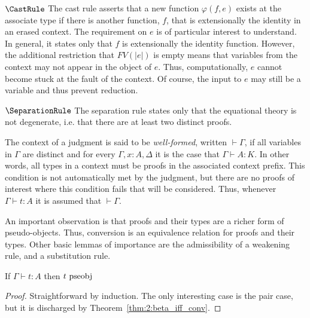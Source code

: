 $\CastRule$ The cast rule asserts that a new function $\varphi(f, e)$ exists at the associate type if there is another function, $f$, that is extensionally the identity in an erased context.
The requirement on $e$ is of particular interest to understand.
In general, it states only that $f$ is extensionally the identity function.
However, the additional restriction that $FV(|e|)$ is empty means that variables from the context may not appear in the object of $e$.
Thus, computationally, $e$ cannot become stuck at the fault of the context.
Of course, the input to $e$ may still be a variable and thus prevent reduction.

$\SeparationRule$ The separation rule states only that the equational theory is not degenerate, i.e. that there are at least two distinct proofs.



The context of a judgment is said to be \textit{well-formed}, written $\vdash \Gamma$, if all variables in $\Gamma$ are distinct and for every $\Gamma, x : A, \Delta$ it is the case that $\Gamma \vdash A : K$.
In other words, all types in a context must be proofs in the associated context prefix.
This condition is not automatically met by the judgment, but there are no proofs of interest where this condition fails that will be considered.
Thus, whenever $\Gamma \vdash t : A$ it is assumed that $\vdash \Gamma$.

An important observation is that proofs and their types are a richer form of pseudo-objects.
Thus, conversion is an equivalence relation for proofs and their types.
Other basic lemmas of importance are the admissibility of a weakening rule, and a substitution rule.

\begin{lemma}
    If $\Gamma \vdash t : A$ then $t~\mbox{\normalfont pseobj}$
    \label{lem:2:infer_implies_pseobj}
\end{lemma}
\begin{proof}
    Straightforward by induction.
    The only interesting case is the pair case, but it is discharged by Theorem~\ref{thm:2:beta_iff_conv}.
\end{proof}


